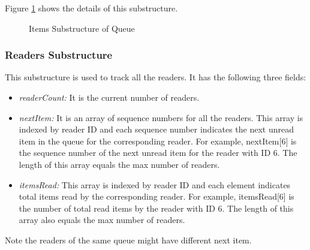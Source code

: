 Figure \ref{fig:queue:struct:items} shows the details of this substructure.
\begin{figure}
\centering
{}
\caption{ Items Substructure of Queue}
\label{fig:queue:struct:items}
\end{figure}
	 

\subsubsection{\label{sub:queue:struct:readers}{Readers Substructure}}
This substructure is used to track all the readers. It has the following three fields:
\begin{itemize}
	\item{\emph{readerCount:} It is the current number of readers. }
	\item{\emph{nextItem:} It is an array of sequence numbers for all the readers. This array is indexed by reader ID and each sequence number indicates the next unread item in the queue for the corresponding reader. For example, nextItem[6] is the sequence number of the next unread item for the reader with ID 6. The length of this array equals the max number of readers. }
		\item{\emph{itemsRead:}  This array is indexed by reader ID and each element indicates total items read by the corresponding reader. For example, itemsRead[6] is the number of total read items by the reader with ID 6. The length of this array also equals the max number of readers. }
\end{itemize}	
Note the readers of the same queue might have different next item. 


